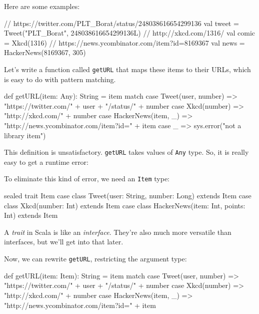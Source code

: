 \documentclass{book}
\begin{document}
Here are some examples:

\begin{scalacode}
// https://twitter.com/PLT_Borat/status/248038616654299136
val tweet = Tweet("PLT_Borat", 248038616654299136L)
// http://xkcd.com/1316/
val comic = Xkcd(1316)
// https://news.ycombinator.com/item?id=8169367
val news = HackerNews(8169367, 305)
\end{scalacode}

Let's write a function called \verb|getURL| that maps these items to their URLs,
which is easy to do with pattern matching.

\begin{scalacode}
def getURL(item: Any): String = item match {
  case Tweet(user, number) => "https://twitter.com/" + user + "/status/" + number
  case Xkcd(number) => "http://xkcd.com/" + number
  case HackerNews(item, _) => "http://news.ycombinator.com/item?id=" + item
  case _ => sys.error("not a library item")
}
\end{scalacode}

This definition is unsatisfactory. \verb|getURL| takes values of \verb|Any|
type. So, it is really easy to get a runtime error:


To eliminate this kind of error, we need an \verb|Item| type:

\begin{scalacode}
sealed trait Item
case class Tweet(user: String, number: Long) extends Item
case class Xkcd(number: Int) extends Item
case class HackerNews(item: Int, points: Int) extends Item
\end{scalacode}

A \emph{trait} in Scala is like an \emph{interface}. They're also much more
versatile than interfaces, but we'll get into that later.

Now, we can rewrite \verb|getURL|, restricting the argument type:

\begin{scalacode}
def getURL(item: Item): String = item match {
  case Tweet(user, number) => "https://twitter.com/" + user + "/status/" + number
  case Xkcd(number) => "http://xkcd.com/" + number
  case HackerNews(item, _) => "http://news.ycombinator.com/item?id=" + item
}
\end{scalacode}
\end{document}
